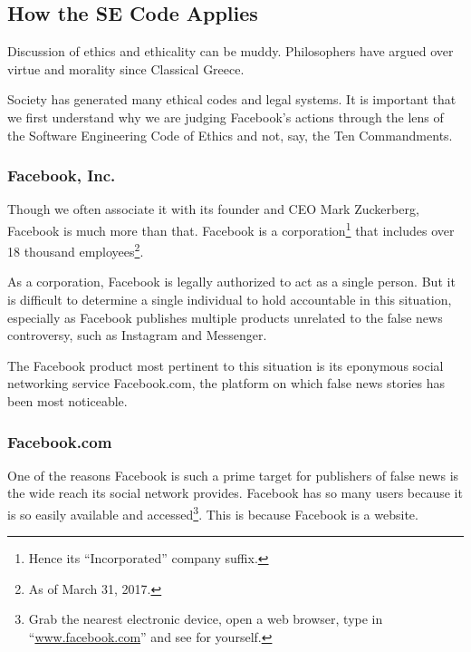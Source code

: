 

\subsection{How the SE Code Applies}

\par Discussion of ethics and ethicality can be muddy. Philosophers have argued over virtue and morality since Classical Greece.\citeneeded

\par Society has generated many ethical codes and legal systems. It is important that we first understand why we are judging Facebook's actions through the lens of the Software Engineering Code of Ethics and not, say, the Ten Commandments.

\subsubsection{Facebook, Inc.}

\par Though we often associate it with its founder and CEO Mark Zuckerberg, Facebook is much more than that. Facebook is a corporation\footnote{Hence its ``Incorporated'' company suffix.} that includes over 18 thousand employees\footnote{As of March 31, 2017.}. \cite{fb_newsroom} 

\par As a corporation, Facebook is legally authorized to act as a single person. \cite{dictionary} But it is difficult to determine a single individual to hold accountable in this situation, especially as Facebook publishes multiple products unrelated to the false news controversy, such as Instagram and Messenger. \cite{fb_newsroom}

\par The Facebook product most pertinent to this situation is its eponymous social networking service Facebook.com, the platform on which false news stories has been most noticeable. \cite{tc_facebook_responsibility}

\subsubsection{Facebook.com}

\par One of the reasons Facebook is such a prime target for publishers of false news is the wide reach its social network provides. \cite{telegraph_fake_news} Facebook has so many users because it is so easily available and accessed\footnote{Grab the nearest electronic device, open a web browser, type in ``\url{www.facebook.com}'' and see for yourself.}. This is because Facebook is a website.

